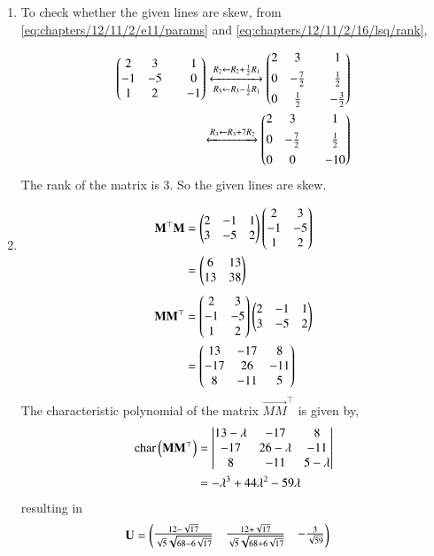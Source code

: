 \begin{enumerate}
\item 
To check whether the given lines are skew,
from \eqref{eq:chapters/12/11/2/e11/params}
and 
	    \eqref{eq:chapters/12/11/2/16/lsq/rank},

\begin{align*}
\begin{pmatrix}2&3&&1\\-1&-5&&0\\1&2&&-1\end{pmatrix}
\xleftrightarrow[R_3 \leftarrow R_3 - \frac{1}{2}R_1]{R_2 \leftarrow R_2 + \frac{1}{2}R_1}
\begin{pmatrix}2&3&&1\\[1ex]0&-\frac{7}{2}&&\frac{1}{2}\\[1ex]0&\frac{1}{2}&&-\frac{3}{2}\end{pmatrix}\\
\xleftrightarrow{R_3 \leftarrow R_3 + 7R_2}
\begin{pmatrix}2&3&&1\\[1ex]0&-\frac{7}{2}&&\frac{1}{2}\\[1ex]0&0&&-10\end{pmatrix}
\end{align*}
The rank of the matrix is 3. So the given lines are skew.
\item 
\begin{align}
\mathbf{M}^\top\mathbf{M} &= \begin{pmatrix}2&-1&1\\3&-5&2\end{pmatrix}\begin{pmatrix}2&3\\-1&-5\\1&2\end{pmatrix} \\ 
&= \begin{pmatrix}6&13\\13&38\end{pmatrix} \label{eq:chapters/12/11/2/311/svd/MtM}
\end{align}
\begin{align}
\mathbf{MM}^\top &= \begin{pmatrix}2&3\\-1&-5\\1&2\end{pmatrix}\begin{pmatrix}2&-1&1\\3&-5&2\end{pmatrix}\\
&= \begin{pmatrix}13&-17&8\\-17&26&-11\\8&-11&5\end{pmatrix} \label{eq:chapters/12/11/2/311/svd/MMt}
\end{align}
The characteristic polynomial of the matrix $\vec{MM}^\top$ is given by,
\begin{align}
\text{char}\left(\mathbf{MM}^\top\right) &= \begin{vmatrix}13-\lambda&-17&8\\-17&26-\lambda&-11\\8&-11&5-\lambda\end{vmatrix} \\
&= -\lambda^3 + 44\lambda^2-59\lambda
\end{align}
resulting in 
\begin{align}
    \mathbf{U} &= \begin{pmatrix}\frac{12-\sqrt{17}}{\sqrt{5}\sqrt{68-6\sqrt{17}}} & \frac{12+\sqrt{17}}{\sqrt{5}\sqrt{68+6\sqrt{17}}} & -\frac{3}{\sqrt{59}}\\
\end{pmatrix}
\end{align}
\end{enumerate}
